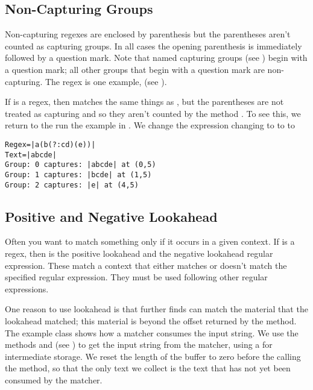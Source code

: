 \subsection{Non-Capturing Groups}

Non-capturing regexes are enclosed by parenthesis 
but the parentheses aren't counted as capturing groups. 
In all cases the opening parenthesis is immediately followed by a question mark.
Note that named capturing groups (see ) begin with
a question mark; all other groups that begin with a question mark are non-capturing.
The regex  is one example,
(see ).

If 
is a regex, then  matches the same things as
, but the parentheses are not treated as capturing and so
they aren't counted by the method .
To see this, we return to the run the  example in .
We change the expression changing  to
to  to
%
\begin{verbatim}
Regex=|a(b(?:cd)(e))|
Text=|abcde|
Group: 0 captures: |abcde| at (0,5)
Group: 1 captures: |bcde| at (1,5)
Group: 2 captures: |e| at (4,5)
\end{verbatim}
%

\subsection{Positive and Negative Lookahead}

Often you want to match something only if it occurs in a given
context.  If  is a regex, then  is
the positive lookahead and  the negative
lookahead regular expression.  These match a context that either
matches or doesn't match the specified regular expression.  They
must be used following other regular expressions.

One reason to use lookahead is that further finds can match
the material that the lookahead matched; this material is beyond
the offset returned by the  method.
The example class  shows how a matcher consumes
the input string.
%
%
%
We use the methods  and 
(see ) to get the input string from the
matcher, using a  for intermediate storage.
We reset the length of the buffer to zero before the calling the
 method, so that the only text we collect is the
text that has not yet been consumed by the matcher.

